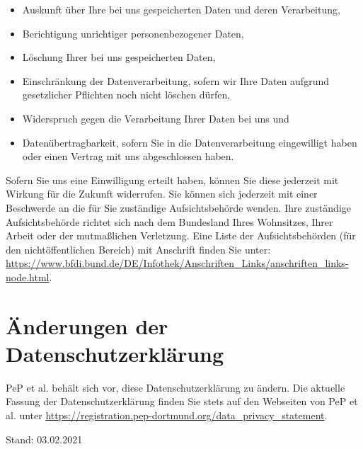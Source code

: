 \documentclass[
  fontsize=12pt,
  paper=a4,
  DIV14,
  parskip,
]{scrartcl}
\begin{document}
\begin{itemize}
  \item Auskunft über Ihre bei uns gespeicherten Daten und deren Verarbeitung,
  \item Berichtigung unrichtiger personenbezogener Daten,
  \item Löschung Ihrer bei uns gespeicherten Daten,
  \item Einschränkung der Datenverarbeitung, sofern wir Ihre Daten aufgrund
        gesetzlicher Pflichten noch nicht löschen dürfen,
  \item Widerspruch gegen die Verarbeitung Ihrer Daten bei uns und
  \item Datenübertragbarkeit, sofern Sie in die Datenverarbeitung
        eingewilligt haben oder einen Vertrag mit uns abgeschlossen haben.
\end{itemize}

Sofern Sie uns eine Einwilligung erteilt haben, können Sie diese jederzeit
mit Wirkung für die Zukunft widerrufen. Sie können sich jederzeit mit einer
Beschwerde an die für Sie zuständige Aufsichtsbehörde wenden. Ihre zuständige
Aufsichtsbehörde richtet sich nach dem Bundesland Ihres Wohnsitzes, Ihrer
Arbeit oder der mutmaßlichen Verletzung. Eine Liste der Aufsichtsbehörden
(für den nichtöffentlichen Bereich) mit Anschrift finden Sie unter: \url{https://www.bfdi.bund.de/DE/Infothek/Anschriften_Links/anschriften_links-node.html}.

\section{Änderungen der Datenschutzerklärung}

PeP et al. behält sich vor, diese Datenschutzerklärung zu ändern. Die
aktuelle Fassung der Datenschutzerklärung finden Sie stets auf den Webseiten
von PeP et al. unter \url{https://registration.pep-dortmund.org/data_privacy_statement}.

Stand: 03.02.2021
\end{document}
